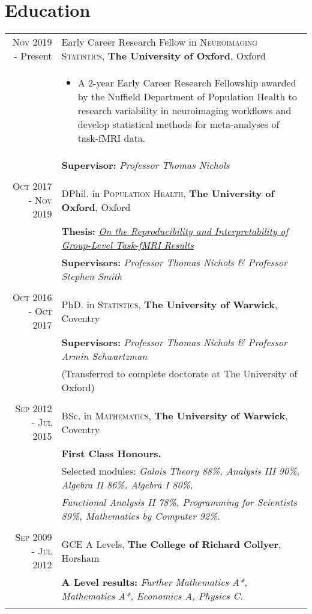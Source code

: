 \documentclass[a4paper,10pt]{article}
\begin{document}
\section{Education}
\begin{tabular}{rl}	
\textsc{Nov} 2019 - Present & Early Career Research Fellow in \textsc{Neuroimaging Statistics}, \textbf{The University of Oxford}, Oxford\\
 &\begin{minipage}[t]{0.8\textwidth} \begin{itemize} \item  A 2-year Early Career Research Fellowship awarded by the Nuffield Department of Population Health to research variability in neuroimaging workflows and develop statistical methods for meta-analyses of task-fMRI data. 
 \end{itemize}\end{minipage}\\
 & \textbf{Supervisor:} \textit{Professor Thomas Nichols} \\&\\ 
\textsc{Oct} 2017 - \textsc{Nov} 2019 & DPhil. in \textsc{Population Health}, \textbf{The University of Oxford}, Oxford\\
& \textbf{Thesis:} \textit{\href{https://doi.org/10.31237/osf.io/mj7qa}{On the Reproducibility and Interpretability of Group-Level Task-fMRI Results}}\\
& \textbf{Supervisors:} \textit{Professor Thomas Nichols \& Professor Stephen Smith} \\&\\ 
\textsc{Oct} 2016 - \textsc{Oct} 2017 & PhD. in \textsc{Statistics}, \textbf{The University of Warwick}, Coventry\\
& \textbf{Supervisors:} \textit{Professor Thomas Nichols \& Professor Armin Schwartzman} \\
& (Transferred to complete doctorate at The University of Oxford)\\&\\
\textsc{Sep} 2012 - \textsc{Jul} 2015 & BSc. in \textsc{Mathematics}, \textbf{The University of Warwick}, Coventry\\
& \textbf{First Class Honours.} \\
& Selected modules: \textit{Galois Theory 88\%, Analysis III 90\%, Algebra II 86\%, Algebra I 80\%,}\\
&\textit{Functional Analysis II 78\%, Programming for Scientists 89\%, Mathematics by Computer 92\%.}\\&\\
\textsc{Sep} 2009 - \textsc{Jul} 2012 & GCE A Levels, \textbf{The College of Richard Collyer}, Horsham\\
& \textbf{A Level results:} \textit{Further Mathematics A*, Mathematics A*, Economics A, Physics C.}\\&\\
\end{tabular}
\end{document}
